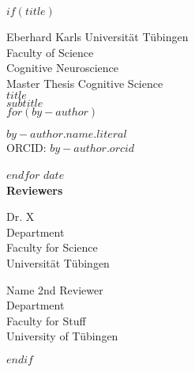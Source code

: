 
$if(title)$
{
\centering
\huge Eberhard Karls Universität Tübingen \\
\Large Faculty of Science \\
\Large Cognitive Neuroscience \\
\vspace{10ex}
\huge Master Thesis Cognitive Science\\
\vspace{3ex}
\huge\textbf{$title$}\\
\huge $subtitle$\\
\vspace{3ex}
$for(by-author)$
\begin{center}
\Large $by-author.name.literal$\\
\large ORCID: \href{https://orcid.org/$by-author.orcid$}{$by-author.orcid$}
\end{center}
$endfor$
\vspace{3ex}
\Large $date$\\
\vspace{10ex}
\Large\textbf{Reviewers}\\
\vspace{3ex}
\parbox{0.5\textwidth}{
	\begin{center}
		{\Large Dr. X}\\
		\large Department\\
		Faculty for Science\\
		Universität Tübingen
	\end{center}}
\hfill
\parbox{0.5\textwidth}{
	\begin{center}
  		{\Large Name 2nd Reviewer}\\
  		\large Department\\
  		Faculty for Stuff\\
  		University of Tübingen
  	\end{center}
 }
}
$endif$